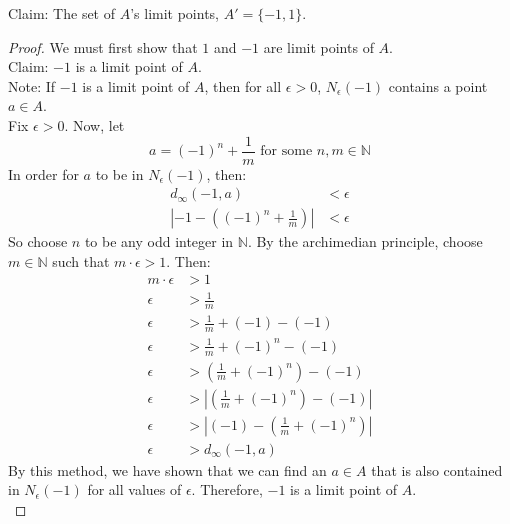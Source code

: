 \documentclass{amsart}
\begin{document}
\begin{enumerate}[1.]
Claim: The set of $A$'s limit points, $A' = \{-1, 1\}$.
\begin{proof}
We must first show that $1$ and $-1$ are limit points of $A$. \\

Claim: $-1$ is a limit point of $A$. \\
Note: If $-1$ is a limit point of $A$, then for all $\epsilon > 0$,
$N_\epsilon(-1)$ contains a point $a \in A$. \\
Fix $\epsilon > 0$. Now, let
\[
    a = (-1)^n + \frac{1}{m} \text{ for some } n,m \in \mathbb{N}  
\]
In order for $a$ to be in $N_\epsilon(-1)$, then:
\begin{align*}
    d_\infty(-1,a) &< \epsilon \\
    \left| -1 - \left( (-1)^n + \frac{1}{m} \right) \right| &< \epsilon
\end{align*}
So choose $n$ to be any odd integer in $\mathbb{N}$. By the archimedian principle,
choose $m \in \mathbb{N}$ such that $m\cdot \epsilon > 1$. Then:
\begin{align*}
    m\cdot\epsilon &> 1 \\
    \epsilon &> \frac{1}{m} \\
    \epsilon &> \frac{1}{m} + (-1) - (-1) \\
    \epsilon &> \frac{1}{m} + (-1)^n - (-1) \\
    \epsilon &> \left( \frac{1}{m} + (-1)^n \right) - (-1) \\
    \epsilon &> \left| \left( \frac{1}{m} + (-1)^n \right) - (-1) \right| \\
    \epsilon &> \left| (-1) - \left( \frac{1}{m} + (-1)^n \right) \right| \\
    \epsilon &> d_\infty(-1, a)
\end{align*}
By this method, we have shown that we can find an $a \in A$ that 
is also contained in $N_\epsilon(-1)$ for all values of $\epsilon$.
Therefore, $-1$ is a limit point of $A$. \\


\end{proof}
\end{enumerate}
\end{document}
